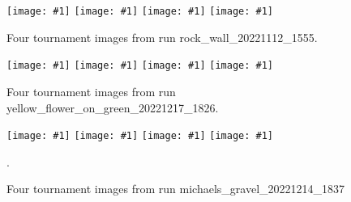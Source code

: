 \documentclass[acmtog]{acmart}
\newcommand{\igfour}[1]{\texttt{[image: \#1]}}
\begin{document}
\begin{figure}
    \igfour{20221112_1555_step_6495.png}
    \hfill
    \igfour{20221112_1555_step_5510.png}
    \hfill
    \igfour{20221112_1555_step_5681.png}
    \hfill
    \igfour{20221112_1555_step_6370.png}
    \caption{Four tournament images from run rock\_wall\_20221112\_1555.}
    \label{fig:rock_wall_4x}
\end{figure}

\begin{figure}
    \igfour{20221218_step_5396.png}
    \hfill
    \igfour{20221218_step_5641.png}
    \hfill
    \igfour{20221218_step_5947.png}
    \hfill
    \igfour{20221218_step_6753.png}
    \caption{Four tournament images from run yellow\_flower\_on\_green\_20221217\_1826.}
    \label{fig:yellow_flower_4x}
\end{figure}


\begin{figure}
    \igfour{20221215_step_5867.png}
    \hfill
    \igfour{20221215_step_5892.png}
    \hfill
    \igfour{20221215_step_6830.png}
    \hfill
    \igfour{20221215_step_6916.png}
    \caption{Four tournament images from run michaels\_gravel\_20221214\_1837}.
    \label{fig:michaels_gravel_4x}
\end{figure}
\end{document}
